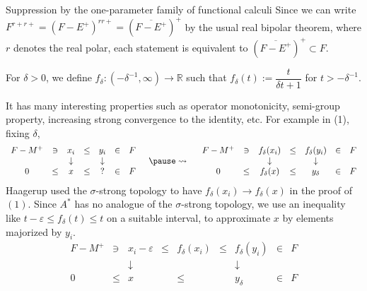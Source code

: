 \documentclass{../../../slide}
\begin{document}
\begin{frame}{Suppression by the one-parameter family of functional calculi}
Since we can write $F^{r+r+}=(F-E^+)^{rr+}=(\overline{F-E^+})^+$ by the usual real bipolar theorem, where $r$ denotes the real polar, each statement is equivalent to $(\overline{F-E^+})^+\subset F$.
\pause
\begin{defn}
For $\delta>0$, we define $f_\delta:(-\delta^{-1},\infty)\to\mathbb{R}$ such that $f_\delta(t):=\dfrac t{\delta t+1}$ for $t>-\delta^{-1}$.
\end{defn}
It has many interesting properties such as operator monotonicity, semi-group property, increasing strong convergence to the identity, etc.
\pause
For example in (1), fixing $\delta$,
\[\begin{array}{ccccccc}
F-M^+ & \ni & x_i & \le & y_i & \in & F \\
&& \downarrow && \downarrow &&\\
0 & \le & x & \le & ? & \in & F
\end{array}
\quad\pause\leadsto\quad
\begin{array}{ccccccc}
F-M^+ & \ni & f_\delta(x_i) & \le & f_\delta(y_i) & \in & F \\
&& \downarrow && \downarrow &&\\
0 & \le & f_\delta(x) & \le & y_\delta & \in & F
\end{array}\]
Haagerup used the $\sigma$-strong topology to have $f_\delta(x_i)\to f_\delta(x)$ in the proof of $(1)$.
\pause
Since $A^*$ has no analogue of the $\sigma$-strong topology, we use an inequality like $t-\varepsilon\le f_\delta(t)\le t$ on a suitable interval, to approximate $x$ by elements majorized by $y_i$.
\[\begin{array}{ccccccccc}
F-M^+ & \ni & x_i-\varepsilon & \le & f_\delta(x_i) & \le & f_\delta(y_i) & \in & F \\
&& \downarrow && && \downarrow &&\\
0 & \le & x && \le && y_\delta & \in & F
\end{array}\]
\end{frame}
\end{document}
